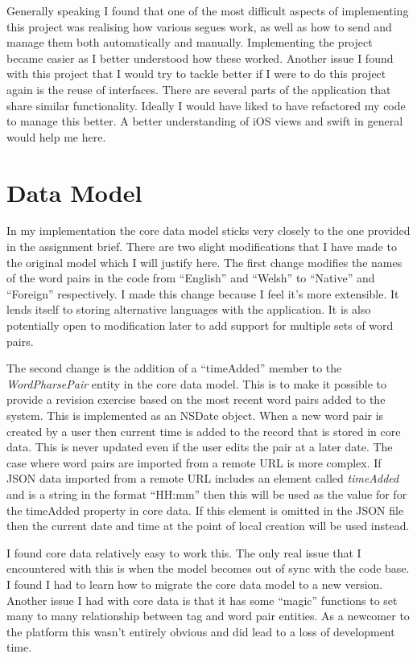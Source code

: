 \documentclass[paper=a4, fontsize=11pt]{scrartcl}	%
\numberwithin{equation}{section}															%
\numberwithin{figure}{section}																%
\numberwithin{table}{section}
\begin{document}
Generally speaking I found that one of the most difficult aspects of implementing this project was realising how various segues work, as well as how to send and manage them both automatically and manually. Implementing the project became easier as I better understood how these worked. Another issue I found with this project that I would try to tackle better if I were to do this project again is the reuse of interfaces. There are several parts of the application that share similar functionality. Ideally I would have liked to have refactored my code to manage this better. A better understanding of iOS views and swift in general would help me here.

\section{Data Model}
In my implementation the core data model sticks very closely to the one provided in the assignment brief. There are two slight modifications that I have made to the original model which I will justify here. The first change modifies the names of the word pairs in the code from ``English'' and ``Welsh'' to ``Native'' and ``Foreign'' respectively. I made this change because I feel it's more extensible. It lends itself to storing alternative languages with the application. It is also potentially open to modification later to add support for multiple sets of word pairs. 

The second change is the addition of a ``timeAdded'' member to the \textit{WordPharsePair} entity in the core data model. This is to make it possible to provide a revision exercise based on the most recent word pairs added to the system. This is implemented as an NSDate object. When a new word pair is created by a user then current time is added to the record that is stored in core data. This is never updated even if the user edits the pair at a later date. The case where word pairs are imported from a remote URL is more complex. If JSON data imported from a remote URL includes an element called \textit{timeAdded} and is a string in the format ``HH:mm'' then this will be used as the value for for the timeAdded property in core data. If this element is omitted in the JSON file then the current date and time at the point of local creation will be used instead. 

I found core data relatively easy to work this. The only real issue that I encountered with this is when the model becomes out of sync with the code base. I found I had to learn how to migrate the core data model to a new version. Another issue I had with core data is that it has some ``magic'' functions to set many to many relationship between tag and word pair entities. As a newcomer to the platform this wasn't entirely obvious and did lead to a loss of development time.
\end{document}
